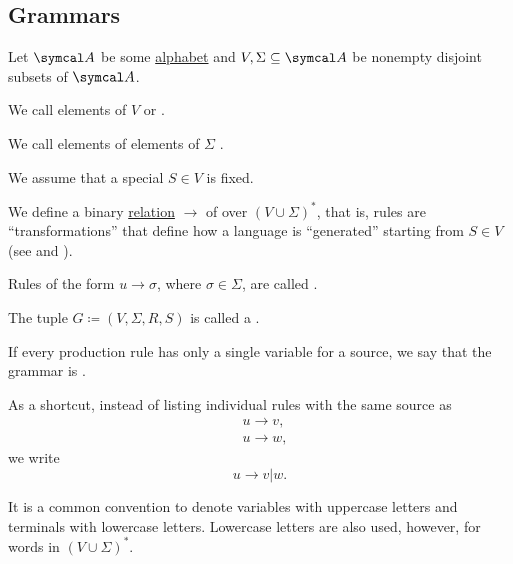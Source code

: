 \subsection{Grammars}\label{subsec:grammars}

\begin{definition}\label{def:grammar}
  Let \( \Cal{A} \) be some \hyperref[def:language/alphabet]{alphabet} and \( V, \Sigma \subseteq \Cal{A} \) be nonempty disjoint subsets of \( \Cal{A} \).

  \begin{DefEnum}
     We call elements of \( V \)  or .

     We call elements of elements of \( \Sigma \) .

     We assume that a special  \( S \in V \) is fixed.

     We define a binary \hyperref[def:relation]{relation} \( \to \) of  over \( (V \cup \Sigma)^* \), that is, rules are \enquote{transformations} that define how a language is \enquote{generated} starting from \( S \in V \) (see  and ).

     Rules of the form \( u \to \sigma \), where \( \sigma \in \Sigma \), are called .

     The tuple \( G \coloneqq (V, \Sigma, R, S) \) is called a .

     If every production rule has only a single variable for a source, we say that the grammar is .
  \end{DefEnum}

  As a shortcut, instead of listing individual rules with the same source as
  \begin{align*}
    &u \to v, \\
    &u \to w,
  \end{align*}
  we write
  \begin{equation*}
    u \to v | w.
  \end{equation*}
\end{definition}

\begin{remark}\label{remark:grammar_symbol_case}
  It is a common convention to denote variables with uppercase letters and terminals with lowercase letters. Lowercase letters are also used, however, for words in \( (V \cup \Sigma)^* \).
\end{remark}

